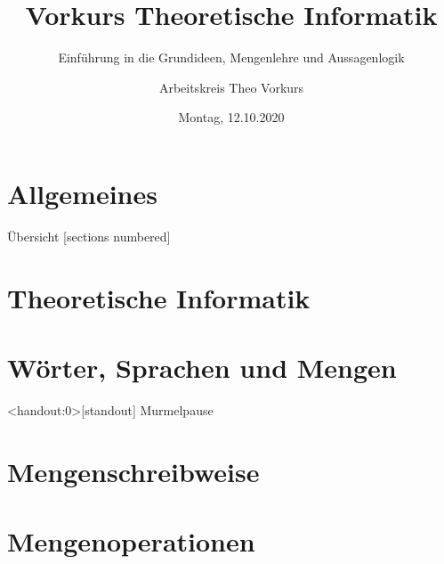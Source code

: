 

\title{Vorkurs Theoretische Informatik}
\subtitle{Einführung in die Grundideen, Mengenlehre und Aussagenlogik}
\date{Montag, 12.10.2020}
\author{Arbeitskreis Theo Vorkurs}



\maketitle

\section{Allgemeines}



\begin{frame}[fragile]{Übersicht}
	[sections numbered]
	\tableofcontents%
\end{frame}

\section{Theoretische Informatik}



\section{Wörter, Sprachen und Mengen}





\begin{frame}<handout:0>[standout]
  Murmelpause
\end{frame}

\section{Mengenschreibweise}



\section{Mengenoperationen}

